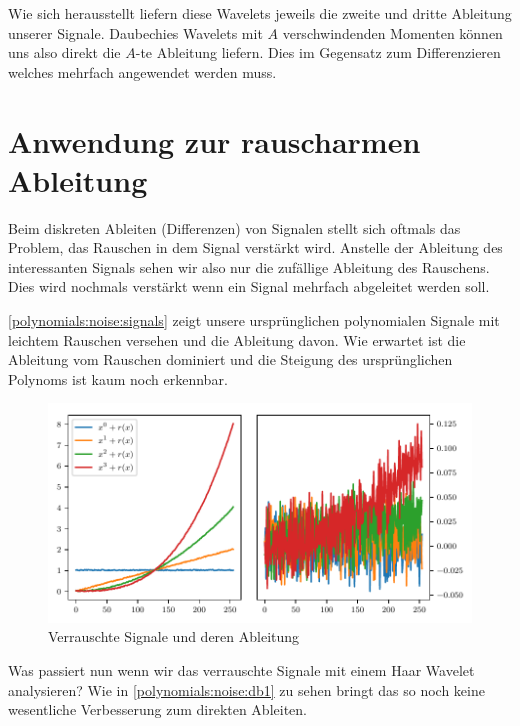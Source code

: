 \begin{refsection}
Wie sich herausstellt liefern diese Wavelets jeweils die zweite und dritte
Ableitung unserer Signale. Daubechies Wavelets mit $A$ verschwindenden Momenten
können uns also direkt die $A$-te Ableitung liefern. Dies im Gegensatz zum
Differenzieren welches mehrfach angewendet werden muss.

\section{Anwendung zur rauscharmen Ableitung}

Beim diskreten Ableiten (Differenzen) von Signalen stellt sich oftmals das
Problem, das Rauschen in dem Signal verstärkt wird. Anstelle der Ableitung des
interessanten Signals sehen wir also nur die zufällige Ableitung des Rauschens.
Dies wird nochmals verstärkt wenn ein Signal mehrfach abgeleitet werden soll.

\autoref{polynomials:noise:signals} zeigt unsere ursprünglichen polynomialen
Signale mit leichtem Rauschen versehen und die Ableitung davon. Wie erwartet
ist die Ableitung vom Rauschen dominiert und die Steigung des ursprünglichen
Polynoms ist kaum noch erkennbar.

\begin{figure}
    \centering
    \includegraphics{papers/polynomials/images/polynomials_noise_signals.pdf}
    \caption{Verrauschte Signale und deren Ableitung\label{polynomials:noise:signals}}
\end{figure}

Was passiert nun wenn wir das verrauschte Signale mit einem Haar Wavelet
analysieren?  Wie in \autoref{polynomials:noise:db1} zu sehen bringt das so
noch keine wesentliche Verbesserung zum direkten Ableiten.


\end{refsection}
